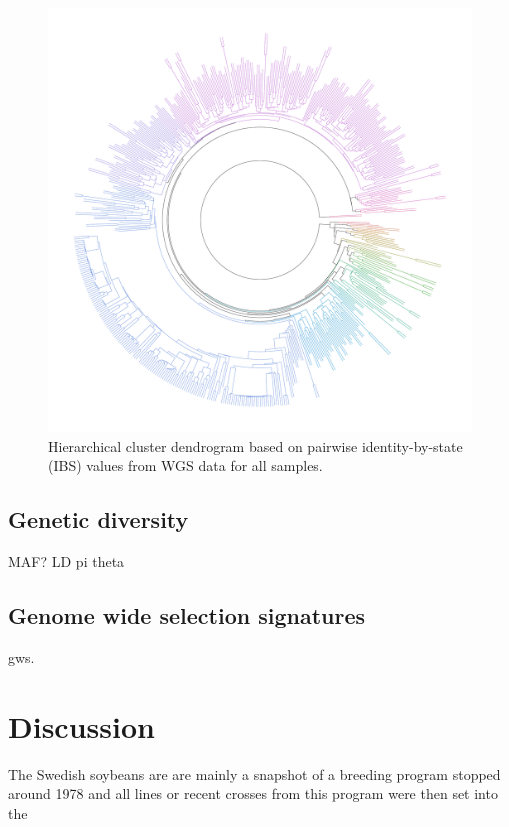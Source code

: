 \documentclass[9pt, onecolumn,twoside]{gsajnl}
\begin{document}
\begin{figure}[t]
\centering
\includegraphics[width=\linewidth]{rainbow.pdf}
\caption{Hierarchical cluster dendrogram based on pairwise identity-by-state (IBS) values from WGS data for all samples. }%
\label{fig:dendo}
\end{figure}

\subsection{Genetic diversity} 

MAF?
LD
pi 
theta


\subsection{Genome wide selection signatures} 
gws.



\section{Discussion}

The Swedish soybeans are are mainly a snapshot of a breeding program stopped around 1978 and all lines or recent crosses from this program were then set into the  
\end{document}
